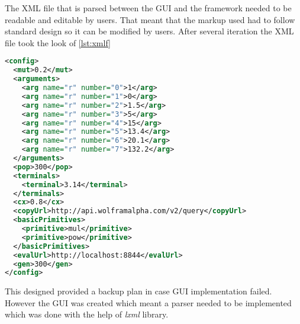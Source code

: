 The XML file that is parsed between the GUI and the framework needed to be readable and editable by users. That meant that the
markup used had to follow standard design so it can be modified by users. After several iteration the XML file took the look of \ref{lst:xmlf}
\begin{lstlisting}[language=XML,caption={XML file used by the framework for configuring the needed parameters},label={lst:xmlf}]
<config>
  <mut>0.2</mut>
  <arguments>
    <arg name="r" number="0">1</arg>
    <arg name="r" number="1">0</arg>
    <arg name="r" number="2">1.5</arg>
    <arg name="r" number="3">5</arg>
    <arg name="r" number="4">15</arg>
    <arg name="r" number="5">13.4</arg>
    <arg name="r" number="6">20.1</arg>
    <arg name="r" number="7">132.2</arg>
  </arguments>
  <pop>300</pop>
  <terminals>
    <terminal>3.14</terminal>
  </terminals>
  <cx>0.8</cx>
  <copyUrl>http://api.wolframalpha.com/v2/query</copyUrl>
  <basicPrimitives>
    <primitive>mul</primitive>
    <primitive>pow</primitive>
  </basicPrimitives>
  <evalUrl>http://localhost:8844</evalUrl>
  <gen>300</gen>
</config>
\end{lstlisting}
This designed provided a backup plan in case GUI implementation failed. However the GUI was created
which meant a parser needed to be implemented which was done with the help of \textit{lxml} library.